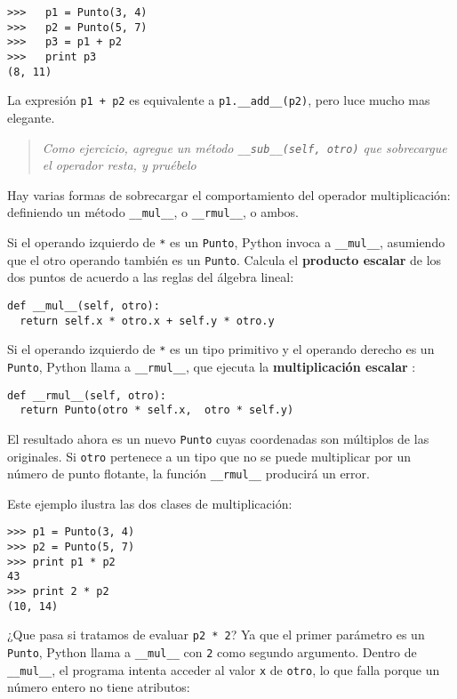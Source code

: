 \beforeverb
\begin{verbatim}
>>>   p1 = Punto(3, 4)
>>>   p2 = Punto(5, 7)
>>>   p3 = p1 + p2
>>>   print p3
(8, 11)
\end{verbatim}
\afterverb
%
La expresión  \texttt{p1 + p2} es equivalente a
\texttt{p1.\_\_add\_\_(p2)}, pero luce mucho mas elegante.

\begin{quote}
{\em Como ejercicio, agregue un método  \texttt{\_\_sub\_\_(self, otro)} que
sobrecargue el operador resta, y pruébelo}
\end{quote}

Hay varias formas de sobrecargar el comportamiento del operador 
multiplicación: definiendo un método \texttt{\_\_mul\_\_}, o \texttt{\_\_rmul\_\_}, 
o ambos.

Si el operando izquierdo de  \texttt{*} es un  \texttt{Punto}, Python invoca
a \texttt{\_\_mul\_\_}, asumiendo que el otro operando también es un  \texttt{Punto}.  Calcula el  {\bf producto escalar} de los dos puntos
de acuerdo a las reglas del álgebra lineal:

\beforeverb
\begin{verbatim}
def __mul__(self, otro):
  return self.x * otro.x + self.y * otro.y
\end{verbatim}
\afterverb
%
Si el operando izquierdo de \texttt{*} es un tipo primitivo y 
el operando derecho es un \texttt{Punto}, Python llama a  \texttt{\_\_rmul\_\_}, que
ejecuta la  {\bf multiplicación escalar }:

\beforeverb
\begin{verbatim}
def __rmul__(self, otro):
  return Punto(otro * self.x,  otro * self.y)
\end{verbatim}
\afterverb
%
El resultado ahora es un nuevo  \texttt{Punto} cuyas coordenadas son  
múltiplos de las originales. Si  \texttt{otro} pertenece a un tipo que
no se puede multiplicar por un número de punto flotante, la función
\texttt{\_\_rmul\_\_} producirá un error.

Este ejemplo ilustra las dos clases de multiplicación:

\beforeverb
\begin{verbatim}
>>> p1 = Punto(3, 4)
>>> p2 = Punto(5, 7)
>>> print p1 * p2
43
>>> print 2 * p2
(10, 14)
\end{verbatim}
\afterverb
%
¿Que pasa si tratamos de evaluar \texttt{p2 * 2}? Ya que el 
primer parámetro es un  \texttt{Punto}, Python llama a
\texttt{\_\_mul\_\_} con \texttt{2} como segundo argumento.
Dentro de  \texttt{\_\_mul\_\_}, el programa intenta acceder
al  valor  \texttt{x} de \texttt{otro}, lo que falla porque
un número entero no tiene atributos:


